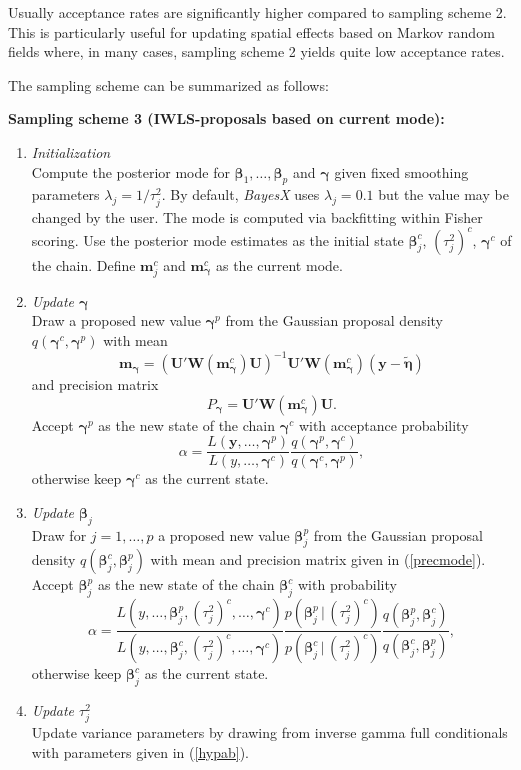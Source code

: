 \documentclass[11pt,a4paper,twoside]{bayesxarticle}
\def \betavec {\boldsymbol{\beta}}
\def \etavec {\boldsymbol{\eta}}
\def \gammavec {\boldsymbol{\gamma}}
\def \yvec {\mathbf{y}}
\def \mvec {\mathbf{m}}
\def \Uvec {\mathbf{U}}
\def \Wvec {\mathbf{W}}
\begin{document}
Usually acceptance rates are significantly higher compared to
sampling scheme 2. This is particularly useful for updating spatial
effects based on Markov random fields where, in many cases, sampling
scheme 2 yields quite low acceptance rates.

The sampling scheme can be summarized as follows:

{\bf Sampling scheme 3 (IWLS-proposals based on current mode):}
\begin{enumerate}
\item {\em Initialization} \\
Compute the posterior mode for $\betavec_1,\dots,\betavec_p$ and $\gammavec$
given fixed smoothing parameters $\lambda_j = 1/\tau^2_j$. By
default, {\em BayesX} uses $\lambda_j = 0.1$ but the value may be
changed by the user. The mode is computed via backfitting within
Fisher scoring. Use the posterior mode estimates as the initial
state $\betavec_j^c$, $(\tau_j^2)^c$, $\gammavec^c$ of the chain. Define
$\mvec_j^c$ and $\mvec_{\gammavec}^c$ as the current mode.
\item {\em Update $\gammavec$} \\
Draw a proposed new value $\gammavec^p$ from the Gaussian proposal
density $q(\gammavec^c,\gammavec^p)$ with mean
$$
\mvec_{\gammavec} = (\Uvec' \Wvec(\mvec_{\gammavec}^c) \Uvec)^{-1}\Uvec' \Wvec(\mvec_{\gammavec}^c)
(\yvec-\tilde{\etavec} )
$$
and precision matrix
$$
P_{\gammavec} = \Uvec' \Wvec(\mvec_{\gammavec}^c) \Uvec.
$$
Accept $\gammavec^p$ as the new state of the chain $\gammavec^c$ with
acceptance probability
$$
\alpha = \frac{ L(\yvec,\dots,\gammavec^p)} {L(y,\dots,\gammavec^c)} \frac{
q(\gammavec^p,\gammavec^c)}{q(\gammavec^c,\gammavec^p)},
$$
otherwise keep $\gammavec^c$ as the current state.
\item {\em Update $\betavec_j$} \\
Draw for $j=1,\dots,p$ a proposed new value $\betavec_j^p$ from the
Gaussian proposal density $q(\betavec_j^c,\betavec_j^p)$ with mean and
precision matrix given in (\ref{precmode}). Accept $\betavec^p_j$ as
the new state of the chain $\betavec_j^c$ with probability
$$
\alpha = \frac{
L(y,\dots,\betavec^{p}_j,(\tau_j^2)^{c},\dots,\gammavec^c)}
{L(y,\dots,\betavec^{c}_j,(\tau_j^2)^{c},\dots,\gammavec^c)}
\frac{p(\betavec_j^p \, | \, (\tau_j^2)^c)}{p(\betavec_j^c \, | \,
(\tau_j^2)^c)} \frac{
q(\betavec_j^p,\betavec_j^c)}{q(\betavec_j^c,\betavec_j^p)},
$$
otherwise keep $\betavec_j^c$ as the current state.
\item {\em Update $\tau^2_j$} \\
Update variance parameters by drawing from inverse gamma full
conditionals with parameters given in (\ref{hypab}).
\end{enumerate}
\end{document}
